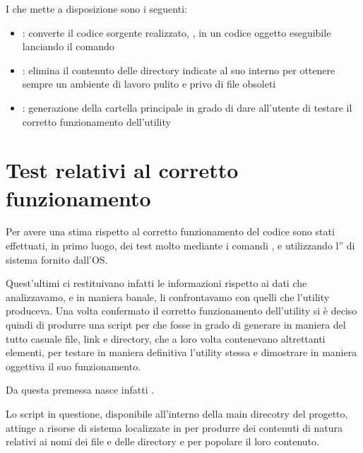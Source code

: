 \documentclass[letterpaper,10pt,italian,openany,oneside]{sphinxmanual}
\begin{document}
I  che mette a disposizione sono i seguenti:
\begin{itemize}
\item {} 
: converte il codice sorgente realizzato, , in un codice oggetto eseguibile lanciando il comando 

\item {} 
: elimina il contenuto delle directory indicate al suo interno per ottenere sempre un ambiente di lavoro pulito e privo di file obsoleti

\item {} 
: generazione della cartella principale  in grado di dare all’utente  di testare il corretto funzionamento dell’utility 

\end{itemize}


\section{Test relativi al corretto funzionamento}
\label{\detokenize{project:test-relativi-al-corretto-funzionamento}}
Per avere una stima rispetto al corretto funzionamento del codice sono stati effettuati, in primo luogo,
dei test molto  mediante i comandi ,  e utilizzando l” di sistema fornito dall’OS.

Quest’ultimi ci restituivano infatti le informazioni  rispetto ai dati che analizzavamo, e in
maniera banale, li confrontavamo con quelli che l’utility produceva. Una volta confermato il corretto funzionamento
dell’utility si è deciso quindi di produrre una script per  che fosse in grado di generare in maniera del tutto
casuale file, link e directory, che a loro volta contenevano altrettanti elementi, per testare in maniera definitiva
l’utility stessa e dimostrare in maniera oggettiva il suo funzionamento.

Da questa premessa nasce infatti .

Lo script in questione, disponibile all’interno della main direcotry del progetto, attinge a risorse di sistema localizzate
in  per produrre dei contenuti di natura  relativi ai nomi dei file e delle directory e
per popolare il loro contenuto.
\end{document}
